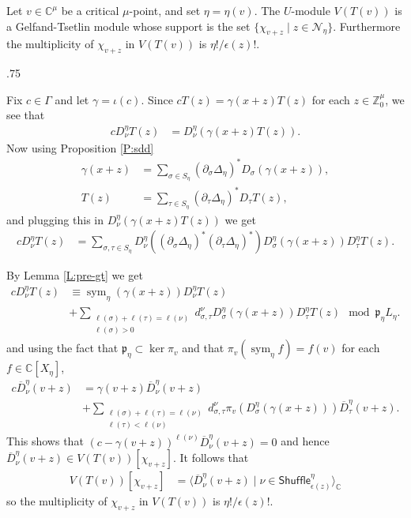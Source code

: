 \documentclass[11pt,fleqn]{article}
\makeatletter
\renewenvironment{proof}[1][\textit{Proof}]{\par
  \pushQED{\qed}%
  \normalfont \topsep.75\paraskip\relax
  \trivlist
  \item[\hskip\labelsep
        \itshape
    #1\@addpunct{.}]\ignorespaces
}{%
  \popQED\endtrivlist\@endpefalse
}
\newcommand\CC{\mathbb C}
\newcommand\ZZ{\mathbb Z}
\newcommand\D{\overline D}
\newcommand\N{\mathcal N}
\newcommand\p{\mathfrak p}
\newcommand\Shuffle{\mathsf{Shuffle}}
\DeclareMathOperator\sym{sym}
\makeatother
\begin{document}
\begin{Theorem}
Let $v \in \CC^\mu$ be a critical $\mu$-point, and set $\eta = \eta(v)$. The 
$U$-module $V(T(v))$ is a Gelfand-Tsetlin module whose support is the set 
$\{\chi_{v+z} \mid z \in \N_\eta\}$. Furthermore the multiplicity of 
$\chi_{v+z}$ in $V(T(v))$ is $\eta!/\epsilon(z)!$.
\end{Theorem}
\begin{proof}
Fix $c \in \Gamma$ and let $\gamma = \iota(c)$. Since $c T(z) = \gamma(x+z) 
T(z)$ for each $z \in \ZZ^\mu_0$, we see that
\begin{align*}
c D_\nu^\eta T(z)
  &= D_\nu^\eta( \gamma(x+z) T(z)).
\end{align*}
Now using Proposition \ref{P:sdd}
\begin{align*}
\gamma(x+z) 
  &= \sum_{\sigma \in S_\eta} (\partial_{\sigma} \Delta_\eta)^*
    D_\sigma(\gamma(x+z)) , \\
T(z)
  &= \sum_{\tau \in S_\eta} (\partial_{\tau} \Delta_\eta)^* 
    D_\tau T(z),
\end{align*}
and plugging this in $D_\nu^\eta( \gamma(x+z) T(z))$ we get
\begin{align*}
c D_\nu^\eta T(z)
  &= \sum_{\sigma,\tau \in S_\eta} D_{\nu}^\eta(
  (\partial_{\sigma} \Delta_\eta)^* (\partial_{\tau} \Delta_\eta)^* )
  D_\sigma^\eta(\gamma(x+z)) D_\tau^\eta T(z).
\end{align*}

By Lemma \ref{L:pre-gt} we get
\begin{align*}
c D_\nu^\eta T(z)
  &\equiv \sym_\eta(\gamma(x+z)) D_\nu^\eta T(z) \\
  &+ \sum_{\substack{\ell(\sigma) + \ell(\tau) = \ell(\nu) \\ \ell(\sigma)>0}} 
    d^\nu_{\sigma, \tau} D_\sigma^\eta(\gamma(x+z)) D_\tau^\eta T(z) 
        \mod \p_\eta L_\eta.
\end{align*}
and using the fact that $\p_\eta \subset \ker \pi_v$ and that $\pi_v(\sym_\eta
f) = f(v)$ for each $f \in \CC[X_\eta]$, 
\begin{align*}
c \D_\nu^\eta (v+z)
  &= \gamma(v+z) \D_\nu^\eta (v+z) \\
  &+ \sum_{\substack{\ell(\sigma) + \ell(\tau) = \ell(\nu) \\ 
      \ell(\tau)<\ell(\nu)}} 
    d^\nu_{\sigma, \tau} \pi_v(D_\sigma^\eta(\gamma(x+z))) \D_\tau^\eta (v+z).
\end{align*}
This shows that $(c-\gamma(v+z))^{\ell(\nu)} \D_\nu^\eta(v+z) = 0$ and hence
$\D_\nu^\eta(v+z) \in V(T(v))[\chi_{v+z}]$. It follows that
\begin{align*}
V(T(v))[\chi_{v+z}]
  &= \langle \D_\nu^\eta(v+z) \mid \nu \in \Shuffle_{\epsilon(z)}^\eta
    \rangle_\CC
\end{align*}
so the multiplicity of $\chi_{v+z}$ in $V(T(v))$ is $\eta!/\epsilon(z)!$.
\end{proof}
\end{document}
